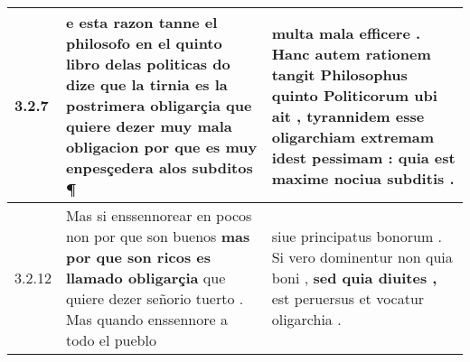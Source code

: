 \begin{tabular}{|p{1cm}|p{6.5cm}|p{6.5cm}|}

\hline
3.2.7 & e esta razon tanne el philosofo en el quinto libro delas politicas \textbf{ do dize que la tirnia es la postrimera obligarçia } que quiere dezer muy mala obligacion por que es muy enpesçedera alos subditos ¶ & multa mala efficere . Hanc autem rationem tangit Philosophus quinto Politicorum ubi ait , \textbf{ tyrannidem esse oligarchiam } extremam idest pessimam : quia est maxime nociua subditis . \\\hline
3.2.12 & Mas si enssennorear en pocos non por que son buenos \textbf{ mas por que son ricos es llamado obligarçia } que quiere dezer señorio tuerto . Mas quando enssennore a todo el pueblo & siue principatus bonorum . Si vero dominentur non quia boni , \textbf{ sed quia diuites , } est peruersus et vocatur oligarchia . \\\hline

\end{tabular}
